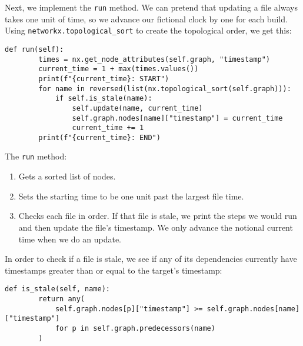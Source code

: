 \documentclass{scrbook}
\begin{document}
Next,
we implement the \texttt{run} method.
We can pretend that updating a file always takes one unit of time,
so we advance our fictional clock by one for each build.
Using \texttt{networkx.topological\_sort} to create the topological order,
we get this:


\begin{lstlisting}[frame=single,frameround=tttt]
    def run(self):
        times = nx.get_node_attributes(self.graph, "timestamp")
        current_time = 1 + max(times.values())
        print(f"{current_time}: START")
        for name in reversed(list(nx.topological_sort(self.graph))):
            if self.is_stale(name):
                self.update(name, current_time)
                self.graph.nodes[name]["timestamp"] = current_time
                current_time += 1
        print(f"{current_time}: END")
\end{lstlisting}



The \texttt{run} method:

\begin{enumerate}

\item 

Gets a sorted list of nodes.



\item 

Sets the starting time to be one unit past the largest file time.



\item 

Checks each file in order.
    If that file is stale,
    we print the steps we would run and then update the file's timestamp.
    We only advance the notional current time when we do an update.



\end{enumerate}


In order to check if a file is stale,
we see if any of its dependencies currently have timestamps
greater than or equal to the target's timestamp:


\begin{lstlisting}[frame=single,frameround=tttt]
    def is_stale(self, name):
        return any(
            self.graph.nodes[p]["timestamp"] >= self.graph.nodes[name]["timestamp"]
            for p in self.graph.predecessors(name)
        )
\end{lstlisting}
\end{document}
